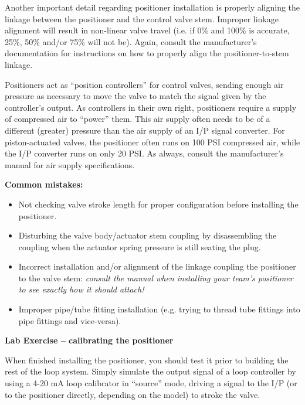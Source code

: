 \documentclass[12pt,a4paper]{article}
\begin{document}
\begin{itemize}
Another important detail regarding positioner installation is properly aligning the linkage between the positioner and the control valve stem.  Improper linkage alignment will result in non-linear valve travel (i.e. if 0\% and 100\% is accurate, 25\%, 50\% and/or 75\% will not be).  Again, consult the manufacturer's documentation for instructions on how to properly align the positioner-to-stem linkage.

\vskip 10pt

Positioners act as ``position controllers'' for control valves, sending enough air pressure as necessary to move the valve to match the signal given by the controller's output.  As controllers in their own right, positioners require a supply of compressed air to ``power'' them.  This air supply often needs to be of a different (greater) pressure than the air supply of an I/P signal converter.  For piston-actuated valves, the positioner often runs on 100 PSI compressed air, while the I/P converter runs on only 20 PSI.  As always, consult the manufacturer's manual for air supply specifications.

\vskip 10pt

{\bf Common mistakes:}

\begin{itemize}
\item{} Not checking valve stroke length for proper configuration before installing the positioner.
\item{} Disturbing the valve body/actuator stem coupling by disassembling the coupling when the actuator spring pressure is still seating the plug.
\item{} Incorrect installation and/or alignment of the linkage coupling the positioner to the valve stem: {\it consult the manual when installing your team's positioner to see exactly how it should attach!}
\item{} Improper pipe/tube fitting installation (e.g. trying to thread tube fittings into pipe fittings and vice-versa).
\end{itemize}




\vfil \eject

\noindent
{\bf Lab Exercise -- calibrating the positioner}

\vskip 5pt

When finished installing the positioner, you should test it prior to building the rest of the loop system.  Simply simulate the output signal of a loop controller by using a 4-20 mA loop calibrator in ``source'' mode, driving a signal to the I/P (or to the positioner directly, depending on the model) to stroke the valve.  


\end{itemize}
\end{document}

